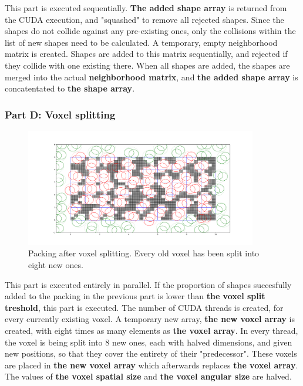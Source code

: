 \documentclass[12pt, oneside]{report}
\begin{document}
This part is executed sequentially. \newline
\textbf{The added shape array} is returned from the CUDA execution, and "squashed" to remove all rejected shapes. Since the shapes do not collide against any pre-existing ones, only the collisions within the list of new shapes need to be calculated. A temporary, empty neighborhood matrix is created. Shapes are added to this matrix sequentially, and rejected if they collide with one existing there. When all shapes are added, the shapes are merged into the actual \textbf{neighborhood matrix}, and \textbf{the added shape array} is concatentated to \textbf{the shape array}.

\subsubsection{Part D: Voxel splitting}

\begin{figure}[H]
  \centering
	\label{GPURSA_Process_5}
	\includegraphics[width=0.9\textwidth,keepaspectratio]{Images/GPURSA/Figure_5.pdf}
	\caption{Packing after voxel splitting. Every old voxel has been split into eight new ones.}
\end{figure}

This part is executed entirely in parallel. \newline
If the proportion of shapes succesfully added to the packing in the previous part is lower than \textbf{the voxel split treshold}, this part is executed. \newline
The number of CUDA threads is created, for every currently existing voxel. A temporary new array, \textbf{the new voxel array} is created, with eight times as many elements as \textbf{the voxel array}. In every thread, the voxel is being split into 8 new ones, each with halved dimensions, and given new positions, so that they cover the entirety of their "predecessor". These voxels are placed in \textbf{the new voxel array} which afterwards replaces \textbf{the voxel array}.
The values of \textbf{the voxel spatial size} and \textbf{the voxel angular size} are halved.
\end{document}
